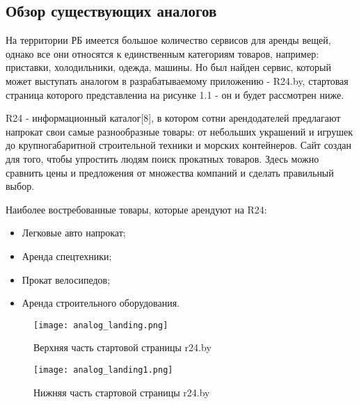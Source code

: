 \subsection{Обзор существующих аналогов}
На территории РБ имеется большое количество сервисов для аренды вещей, однако все они относятся к единственным категориям товаров, например: приставки, холодильники, одежда, машины.
Но был найден сервис, который может выступать аналогом в разрабатываемому приложению - R24.by, стартовая страница которого представлениа на рисунке 1.1 - он и будет рассмотрен ниже.

R24 - информационный каталог[8], в котором сотни арендодателей предлагают напрокат свои самые разнообразные товары: от небольших украшений и игрушек до крупногабаритной строительной техники и морских контейнеров.
Сайт создан для того, чтобы упростить людям поиск прокатных товаров.
Здесь можно сравнить цены и предложения от множества компаний и сделать правильный выбор.

Наиболее востребованные товары, которые арендуют на R24:
\begin{itemize}
  \item Легковые авто напрокат;
  \item Аренда спецтехники;
  \item Прокат велосипедов;
  \item Аренда строительного оборудования.
\end{itemize}

\begin{figure}[ht]
  \centering
      \texttt{[image: analog\_landing.png]}
      \caption{Верхняя часть стартовой страницы r24.by}
\end{figure}
\begin{figure}[ht]
  \centering
      \texttt{[image: analog\_landing1.png]}
      \caption{Нижняя часть стартовой страницы r24.by}
\end{figure}


